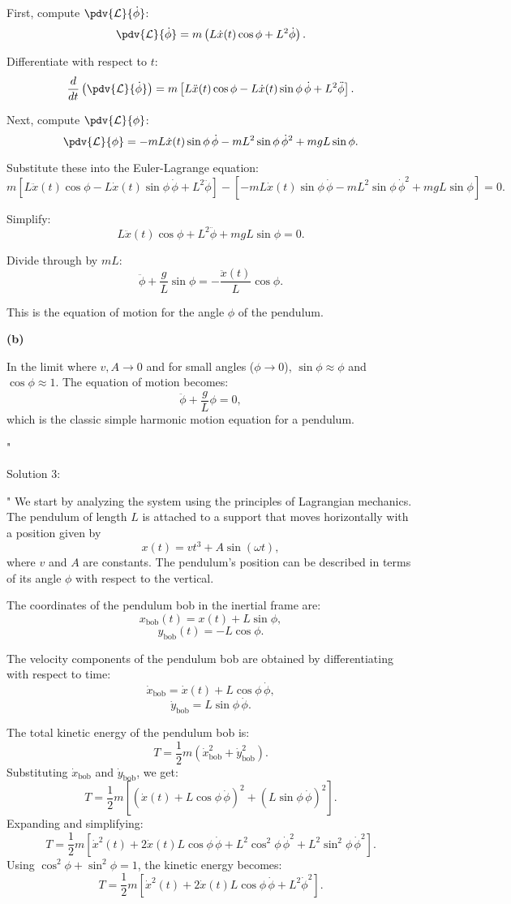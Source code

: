 First, compute $\pdv{\mathcal{L}}{\dot{\phi}}$:
\[
\pdv{\mathcal{L}}{\dot{\phi}} = m\left(L\dot{x}(t)\cos\phi + L^2\dot{\phi}\right).
\]

Differentiate with respect to $t$:
\[
\frac{d}{dt}\left(\pdv{\mathcal{L}}{\dot{\phi}}\right) = m\left[L\ddot{x}(t)\cos\phi - L\dot{x}(t)\sin\phi\,\dot{\phi} + L^2\ddot{\phi}\right].
\]

Next, compute $\pdv{\mathcal{L}}{\phi}$:
\[
\pdv{\mathcal{L}}{\phi} = -mL\dot{x}(t)\sin\phi\,\dot{\phi} - mL^2\sin\phi\,\dot{\phi}^2 + mgL\sin\phi.
\]

Substitute these into the Euler-Lagrange equation:
\[
m\left[L\ddot{x}(t)\cos\phi - L\dot{x}(t)\sin\phi\,\dot{\phi} + L^2\ddot{\phi}\right] - \left[-mL\dot{x}(t)\sin\phi\,\dot{\phi} - mL^2\sin\phi\,\dot{\phi}^2 + mgL\sin\phi\right] = 0.
\]

Simplify:
\[
L\ddot{x}(t)\cos\phi + L^2\ddot{\phi} + mgL\sin\phi = 0.
\]

Divide through by $mL$:
\[
\ddot{\phi} + \frac{g}{L}\sin\phi = -\frac{\ddot{x}(t)}{L}\cos\phi.
\]

This is the equation of motion for the angle $\phi$ of the pendulum.

\textbf{(b)}

In the limit where $v, A \to 0$ and for small angles ($\phi \to 0$), $\sin\phi \approx \phi$ and $\cos\phi \approx 1$. The equation of motion becomes:
\[
\ddot{\phi} + \frac{g}{L}\phi = 0,
\]
which is the classic simple harmonic motion equation for a pendulum.


"

Solution 3:

"
We start by analyzing the system using the principles of Lagrangian mechanics. The pendulum of length $L$ is attached to a support that moves horizontally with a position given by 
\[
x(t) = vt^3 + A\sin(\omega t),
\]
where $v$ and $A$ are constants. The pendulum's position can be described in terms of its angle $\phi$ with respect to the vertical.

The coordinates of the pendulum bob in the inertial frame are:
\[
x_\text{bob}(t) = x(t) + L\sin\phi,
\]
\[
y_\text{bob}(t) = -L\cos\phi.
\]

The velocity components of the pendulum bob are obtained by differentiating with respect to time:
\[
\dot{x}_\text{bob} = \dot{x}(t) + L\cos\phi \, \dot{\phi},
\]
\[
\dot{y}_\text{bob} = L\sin\phi \, \dot{\phi}.
\]

The total kinetic energy of the pendulum bob is:
\[
T = \frac{1}{2}m\left(\dot{x}_\text{bob}^2 + \dot{y}_\text{bob}^2\right).
\]
Substituting $\dot{x}_\text{bob}$ and $\dot{y}_\text{bob}$, we get:
\[
T = \frac{1}{2}m\left[\left(\dot{x}(t) + L\cos\phi \, \dot{\phi}\right)^2 + \left(L\sin\phi \, \dot{\phi}\right)^2\right].
\]
Expanding and simplifying:
\[
T = \frac{1}{2}m\left[\dot{x}^2(t) + 2\dot{x}(t)L\cos\phi \, \dot{\phi} + L^2\cos^2\phi \, \dot{\phi}^2 + L^2\sin^2\phi \, \dot{\phi}^2\right].
\]
Using $\cos^2\phi + \sin^2\phi = 1$, the kinetic energy becomes:
\[
T = \frac{1}{2}m\left[\dot{x}^2(t) + 2\dot{x}(t)L\cos\phi \, \dot{\phi} + L^2\dot{\phi}^2\right].
\]

